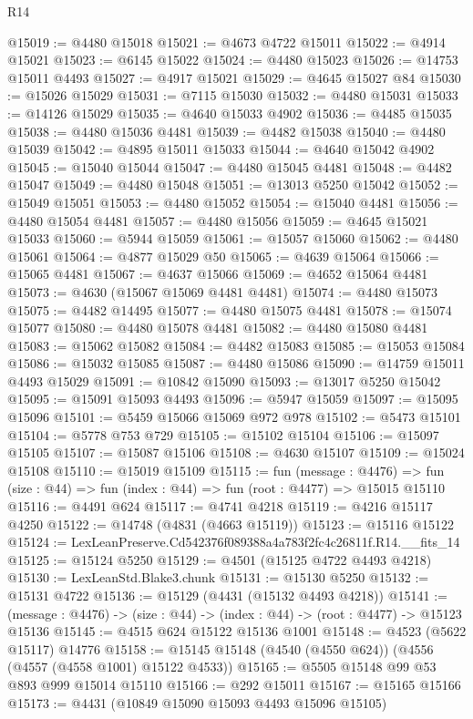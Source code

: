 \begin{lexlean}{R14}
\begin{coremodule}
@15019 := @4480 @15018
@15021 := @4673 @4722 @15011
@15022 := @4914 @15021
@15023 := @6145 @15022
@15024 := @4480 @15023
@15026 := @14753 @15011 @4493
@15027 := @4917 @15021
@15029 := @4645 @15027 @84
@15030 := @15026 @15029
@15031 := @7115 @15030
@15032 := @4480 @15031
@15033 := @14126 @15029
@15035 := @4640 @15033 @4902
@15036 := @4485 @15035
@15038 := @4480 @15036 @4481
@15039 := @4482 @15038
@15040 := @4480 @15039
@15042 := @4895 @15011 @15033
@15044 := @4640 @15042 @4902
@15045 := @15040 @15044
@15047 := @4480 @15045 @4481
@15048 := @4482 @15047
@15049 := @4480 @15048
@15051 := @13013 @5250 @15042
@15052 := @15049 @15051
@15053 := @4480 @15052
@15054 := @15040 @4481
@15056 := @4480 @15054 @4481
@15057 := @4480 @15056
@15059 := @4645 @15021 @15033
@15060 := @5944 @15059
@15061 := @15057 @15060
@15062 := @4480 @15061
@15064 := @4877 @15029 @50
@15065 := @4639 @15064
@15066 := @15065 @4481
@15067 := @4637 @15066
@15069 := @4652 @15064 @4481
@15073 := @4630 (@15067 @15069 @4481 @4481)
@15074 := @4480 @15073
@15075 := @4482 @14495
@15077 := @4480 @15075 @4481
@15078 := @15074 @15077
@15080 := @4480 @15078 @4481
@15082 := @4480 @15080 @4481
@15083 := @15062 @15082
@15084 := @4482 @15083
@15085 := @15053 @15084
@15086 := @15032 @15085
@15087 := @4480 @15086
@15090 := @14759 @15011 @4493 @15029
@15091 := @10842 @15090
@15093 := @13017 @5250 @15042
@15095 := @15091 @15093 @4493
@15096 := @5947 @15059
@15097 := @15095 @15096
@15101 := @5459 @15066 @15069 @972 @978
@15102 := @5473 @15101
@15104 := @5778 @753 @729
@15105 := @15102 @15104
@15106 := @15097 @15105
@15107 := @15087 @15106
@15108 := @4630 @15107
@15109 := @15024 @15108
@15110 := @15019 @15109
@15115 := fun (message : @4476) =>
  fun (size : @44) => fun (index : @44) => fun (root : @4477) => @15015 @15110
@15116 := @4491 @624
@15117 := @4741 @4218
@15119 := @4216 @15117 @4250
@15122 := @14748 (@4831 (@4663 @15119))
@15123 := @15116 @15122
@15124 := LexLeanPreserve.Cd542376f089388a4a783f2fc4c26811f.R14.__fits_14
@15125 := @15124 @5250
@15129 := @4501 (@15125 @4722 @4493 @4218)
@15130 := LexLeanStd.Blake3.chunk
@15131 := @15130 @5250
@15132 := @15131 @4722
@15136 := @15129 (@4431 (@15132 @4493 @4218))
@15141 := (message : @4476) -> (size : @44) -> (index : @44) -> (root : @4477) -> @15123 @15136
@15145 := @4515 @624 @15122 @15136 @1001
@15148 := @4523 (@5622 @15117) @14776
@15158 := @15145 @15148 (@4540 (@4550 @624)) (@4556 (@4557 (@4558 @1001) @15122 @4533))
@15165 := @5505 @15148 @99 @53 @893 @999 @15014 @15110
@15166 := @292 @15011
@15167 := @15165 @15166
@15173 := @4431 (@10849 @15090 @15093 @4493 @15096 @15105)

\end{coremodule}
\end{lexlean}
